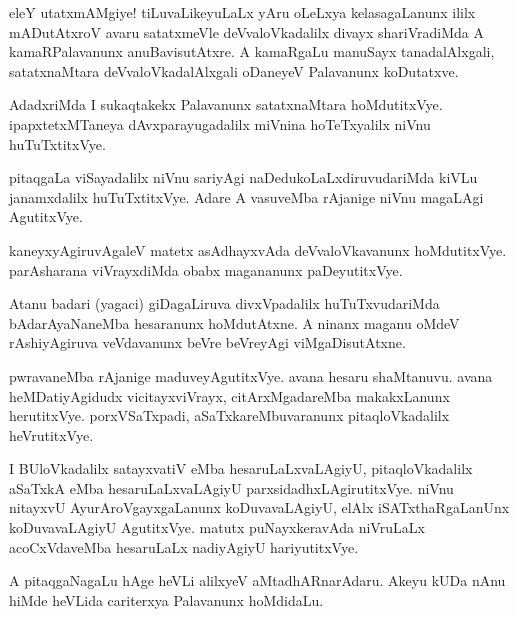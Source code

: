 \documentclass{article}
\begin{document}
\begin{mn}%
eleY utatxmAMgiye! tiLuvaLikeyuLaLx yAru oLeLxya kelasagaLanunx ililx
mADutAtxroV avaru satatxmeVle deVvaloVkadalilx divayx shariVradiMda A
kamaRPalavanunx anuBavisutAtxre. A kamaRgaLu manuSayx tanadalAlxgali,
satatxnaMtara deVvaloVkadalAlxgali oDaneyeV Palavanunx koDutatxve.
\end{mn}

\begin{mn}
AdadxriMda I sukaqtakekx Palavanunx satatxnaMtara
hoMdutitxVye. ipapxtetxMTaneya dAvxparayugadalilx miVnina hoTeTxyalilx
niVnu huTuTxtitxVye.
\end{mn}

\begin{mn}%
pitaqgaLa viSayadalilx niVnu sariyAgi naDedukoLaLxdiruvudariMda kiVLu
janamxdalilx huTuTxtitxVye. Adare A vasuveMba rAjanige niVnu magaLAgi AgutitxVye.
\end{mn}

\begin{mn}
kaneyxyAgiruvAgaleV matetx asAdhayxvAda deVvaloVkavanunx
hoMdutitxVye. parAsharana viVrayxdiMda obabx magananunx paDeyutitxVye.
\end{mn}

\begin{mn}
Atanu badari (yagaci) giDagaLiruva divxVpadalilx huTuTxvudariMda
bAdarAyaNaneMba hesaranunx hoMdutAtxne. A ninanx maganu oMdeV
rAshiyAgiruva veVdavanunx beVre beVreyAgi viMgaDisutAtxne.
\end{mn}

\begin{mn}%
pwravaneMba rAjanige maduveyAgutitxVye. avana hesaru shaMtanuvu. avana
heMDatiyAgidudx vicitayxviVrayx, citArxMgadareMba makakxLanunx
herutitxVye. porxVSaTxpadi, aSaTxkareMbuvaranunx pitaqloVkadalilx heVrutitxVye.
\end{mn}

\begin{mn}%
I BUloVkadalilx satayxvatiV eMba hesaruLaLxvaLAgiyU, pitaqloVkadalilx
aSaTxkA eMba hesaruLaLxvaLAgiyU parxsidadhxLAgirutitxVye. niVnu
nitayxvU AyurAroVgayxgaLanunx koDuvavaLAgiyU, elAlx iSATxthaRgaLanUnx
koDuvavaLAgiyU AgutitxVye. matutx puNayxkeravAda niVruLaLx
acoCxVdaveMba hesaruLaLx nadiyAgiyU hariyutitxVye.
\end{mn}

\begin{mn}%
A pitaqgaNagaLu hAge heVLi alilxyeV aMtadhARnarAdaru. Akeyu kUDa nAnu
hiMde heVLida cariterxya Palavanunx hoMdidaLu.
\end{mn}
\end{document}
